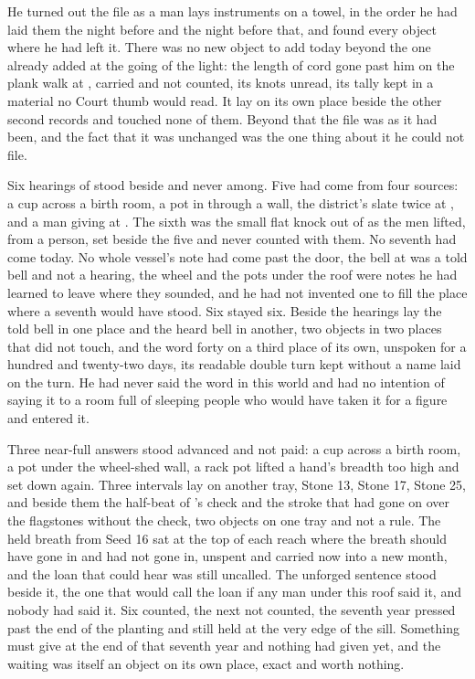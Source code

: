 \scenebreak

He turned out the file as a man lays instruments on a towel, in the order he had laid them the night before and the night before that, and found every object where he had left it. There was no new object to add today beyond the one already added at the going of the light: the length of cord gone past him on the plank walk at , carried and not counted, its knots unread, its tally kept in a material no Court thumb would read. It lay on its own place beside the other second records and touched none of them. Beyond that the file was as it had been, and the fact that it was unchanged was the one thing about it he could not file.

Six hearings of  stood beside and never among. Five had come from four sources: a cup across a birth room, a pot in  through a wall, the district's slate twice at , and a man giving at . The sixth was the small flat knock out of  as the men lifted, from a person, set beside the five and never counted with them. No seventh had come today. No whole vessel's note had come past the door, the bell at  was a told bell and not a hearing, the wheel and the pots under the roof were notes he had learned to leave where they sounded, and he had not invented one to fill the place where a seventh would have stood. Six stayed six. Beside the hearings lay the told bell in one place and the heard bell in another, two objects in two places that did not touch, and the word forty on a third place of its own, unspoken for a hundred and twenty-two days, its readable double turn kept without a name laid on the turn. He had never said the word in this world and had no intention of saying it to a room full of sleeping people who would have taken it for a figure and entered it.

Three near-full answers stood advanced and not paid: a cup across a birth room, a pot under the wheel-shed wall, a rack pot lifted a hand's breadth too high and set down again. Three intervals lay on another tray, Stone 13, Stone 17, Stone 25, and beside them the half-beat of 's check and the stroke that had gone on over the flagstones without the check, two objects on one tray and not a rule. The held breath from Seed 16 sat at the top of each reach where the breath should have gone in and had not gone in, unspent and carried now into a new month, and the loan that could hear was still uncalled. The unforged sentence stood beside it, the one that would call the loan if any man under this roof said it, and nobody had said it. Six counted, the next not counted, the seventh year pressed past the end of the planting and still held at the very edge of the sill. Something must give at the end of that seventh year and nothing had given yet, and the waiting was itself an object on its own place, exact and worth nothing.

